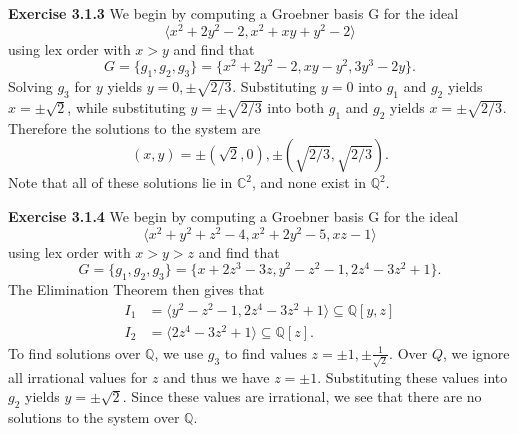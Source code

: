 \documentclass[12pt,oneside]{article}
\newenvironment{exercise}[1]{\vspace{.1in}\noindent\textbf{Exercise #1 \hspace{.05em}}}{}
\newcommand{\C}{\mathbb{C}}
\newcommand{\Q}{\mathbb{Q}}
\begin{document}
\begin{exercise}{3.1.3}
    We begin by computing a Groebner basis G for the ideal 
    \[
        \langle x^2+2y^2-2,x^2+xy+y^2-2 \rangle
    \]
    using lex order with $x > y$ and find that 
    \[
        G = \{ g_1, g_2, g_3 \} = \{ x^2+2y^2-2,xy-y^2,3y^3-2y \}. 
    \]
    Solving $g_3$ for $y$ yields $y = 0, \pm \sqrt{2/3}$. Substituting $y=0$
    into $g_1$ and $g_2$ yields $x=\pm \sqrt{2}$, while substituting $y=\pm \sqrt{2/3}$ 
    into both $g_1$ and $g_2$ yields $x=\pm \sqrt{2/3}$. Therefore the solutions 
    to the system are 
    \[
        (x,y) = \pm(\sqrt{2}, 0), \pm(\sqrt{2/3},\sqrt{2/3}).  
    \]
    Note that all of these solutions lie in $\C^2$, and none exist in $\Q^2$.
\end{exercise}


\begin{exercise}{3.1.4}
    We begin by computing a Groebner basis G for the ideal 
    \[
        \langle x^2+y^2+z^2-4,x^2+2y^2-5,xz-1 \rangle    
    \]
    using lex order with $x > y > z$ and find that 
    \[
        G = \{ g_1,g_2,g_3\} = \{ x+2z^3-3z,y^2-z^2-1,2z^4-3z^2+1 \}.    
    \]
    The Elimination Theorem then gives that 
    \begin{align*}
        I_1 &= \langle y^2-z^2-1, 2z^4-3z^2+1 \rangle \subseteq \Q[y,z]\\
        I_2 &= \langle 2z^4-3z^2+1 \rangle \subseteq \Q[z].
    \end{align*}
    To find solutions over $\Q$, we use $g_3$ to find values $z = \pm1, \pm \frac{1}{\sqrt{2}}$.
    Over $Q$, we ignore all irrational values for $z$ and thus we have $z = \pm1$.
    Substituting these values into $g_2$ yields $y = \pm \sqrt{2}$. Since these 
    values are irrational, we see that there are no solutions to the system 
    over $\Q$.
\end{exercise}

\end{document}
